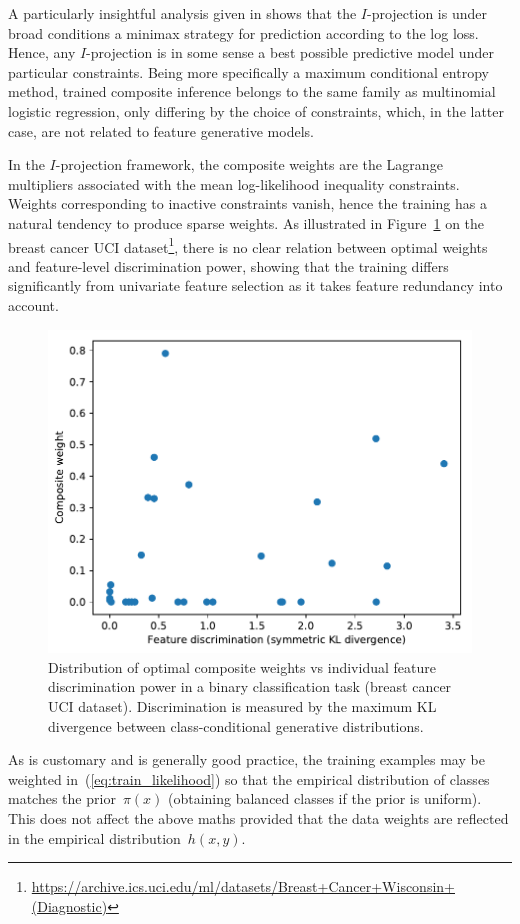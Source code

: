 \documentclass[english]{scrartcl}
\begin{document}
A particularly insightful analysis given in \cite{Grunwald-04} shows that the $I$-projection is under broad conditions a minimax strategy for prediction according to the log loss. Hence, any $I$-projection is in some sense a best possible predictive model under particular constraints. Being more specifically a maximum conditional entropy method, trained composite inference belongs to the same family as multinomial logistic regression, only differing by the choice of constraints, which, in the latter case, are not related to feature generative models.

In the $I$-projection framework, the composite weights are the Lagrange multipliers associated with the mean log-likelihood inequality constraints. Weights corresponding to inactive constraints vanish, hence the training has a natural tendency to produce sparse weights. As illustrated in Figure~\ref{fig:disc_weight_plot} on the breast cancer UCI dataset\footnote{\url{https://archive.ics.uci.edu/ml/datasets/Breast+Cancer+Wisconsin+(Diagnostic)}}, there is no clear relation between optimal weights and feature-level discrimination power, showing that the training differs significantly from univariate feature selection as it takes feature redundancy into account.

\begin{figure}[!ht]
  \begin{center}
    \includegraphics[width=.6\textwidth]{disc_weight_plot.pdf}
  \end{center}
\caption{Distribution of optimal composite weights vs individual feature discrimination power in a binary classification task (breast cancer UCI dataset). Discrimination is measured by the maximum KL divergence between class-conditional generative distributions.}
\label{fig:disc_weight_plot}
\end{figure}


As is customary and is generally good practice, the training examples may be weighted in~(\ref{eq:train_likelihood}) so that the empirical distribution of classes matches the prior~$\pi(x)$ (obtaining balanced classes if the prior is uniform). This does not affect the above maths provided that the data weights are reflected in the empirical distribution~$h(x,y)$. 
\end{document}
